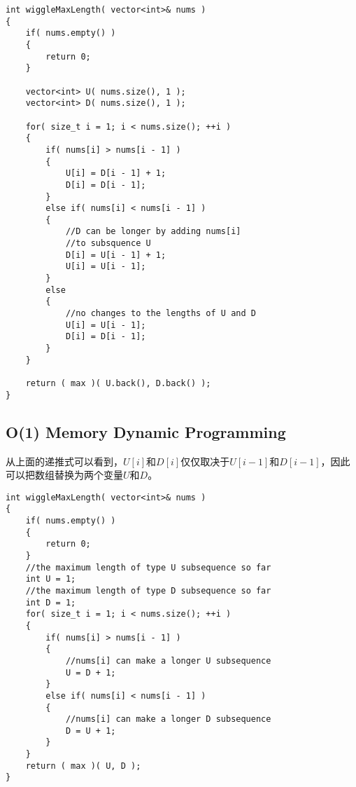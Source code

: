 \setcounter{lstlisting}{0}
\begin{lstlisting}[style=customc, caption={Dynamic Programming}]
int wiggleMaxLength( vector<int>& nums )
{
    if( nums.empty() )
    {
        return 0;
    }

    vector<int> U( nums.size(), 1 );
    vector<int> D( nums.size(), 1 );

    for( size_t i = 1; i < nums.size(); ++i )
    {
        if( nums[i] > nums[i - 1] )
        {
            U[i] = D[i - 1] + 1;
            D[i] = D[i - 1];
        }
        else if( nums[i] < nums[i - 1] )
        {
            //D can be longer by adding nums[i]
            //to subsquence U
            D[i] = U[i - 1] + 1;
            U[i] = U[i - 1];
        }
        else
        {
            //no changes to the lengths of U and D
            U[i] = U[i - 1];
            D[i] = D[i - 1];
        }
    }

    return ( max )( U.back(), D.back() );
}
\end{lstlisting}

\subsection{O(1) Memory Dynamic Programming}
从上面的递推式可以看到，$U[i]$和$D[i]$仅仅取决于$U[i-1]$和$D[i-1]$，因此可以把数组替换为两个变量$U$和$D$。
\begin{lstlisting}[style=customc, caption={$O(1)$ Memory Dynamic Programming}]
int wiggleMaxLength( vector<int>& nums )
{
    if( nums.empty() )
    {
        return 0;
    }
    //the maximum length of type U subsequence so far
    int U = 1;
    //the maximum length of type D subsequence so far
    int D = 1;
    for( size_t i = 1; i < nums.size(); ++i )
    {
        if( nums[i] > nums[i - 1] )
        {
            //nums[i] can make a longer U subsequence
            U = D + 1;
        }
        else if( nums[i] < nums[i - 1] )
        {
            //nums[i] can make a longer D subsequence
            D = U + 1;
        }
    }
    return ( max )( U, D );
}
\end{lstlisting}